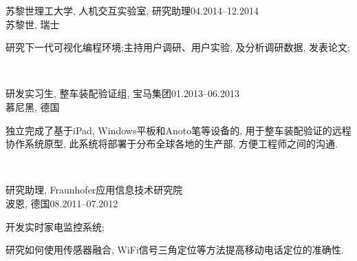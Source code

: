 \documentclass[11pt]{article} %
\begin{document}
\begin{minipage}[t]{0.5\textwidth}
\normalsize{苏黎世理工大学, 人机交互实验室, 研究助理\hfill04.2014--12.2014\\
\small{苏黎世, 瑞士}\\
\begin{inparaitem}
	\item 研究下一代可视化编程环境;主持用户调研、用户实验, 及分析调研数据, 发表论文;
\end{inparaitem}}
\\\par

\normalsize{研发实习生, 整车装配验证组, 宝马集团\hfill01.2013--06.2013\\
\small{慕尼黑, 德国}\\
\begin{inparaitem}
	\item 独立完成了基于iPad, Windows平板和Anoto笔等设备的, 用于整车装配验证的远程协作系统原型, 此系统将部署于分布全球各地的生产部, 方便工程师之间的沟通.
\end{inparaitem}}
\\\par

\normalsize{研究助理, Fraunhofer应用信息技术研究院}\\
\small{波恩, 德国}\hfill\normalsize{08.2011--07.2012}\\
\small{
\begin{inparaitem}
	\item 开发实时家电监控系统;
	\newline
	\item 研究如何使用传感器融合, WiFi信号三角定位等方法提高移动电话定位的准确性.
\end{inparaitem}}
\\\par



\end{minipage} %
\hfill
\end{document}
